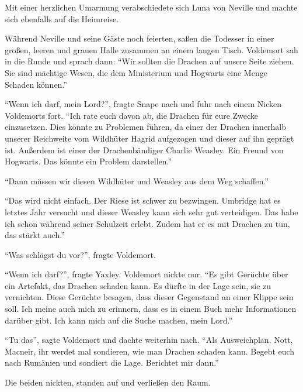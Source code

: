 Mit einer herzlichen Umarmung verabschiedete sich Luna von Neville und machte sich ebenfalls auf die Heimreise.

\trenn

Während Neville und seine Gäste noch feierten, saßen die Todesser in einer großen, leeren und grauen Halle zusammen an einem langen Tisch. Voldemort sah in die Runde und sprach dann: \enquote{Wir sollten die Drachen auf unsere Seite ziehen. Sie sind mächtige Wesen, die dem Ministerium und Hogwarts eine Menge Schaden können.}

\enquote{Wenn ich darf, mein Lord?}, fragte Snape nach und fuhr nach einem Nicken Voldemorts fort. \enquote{Ich rate euch davon ab, die Drachen für eure Zwecke einzusetzen. Dies könnte zu Problemen führen, da einer der Drachen innerhalb unserer Reichweite vom Wildhüter Hagrid aufgezogen und dieser auf ihn geprägt ist. Außerdem ist einer der Drachenbändiger Charlie Weasley. Ein Freund von Hogwarts. Das könnte ein Problem darstellen.}

\enquote{Dann müssen wir diesen Wildhüter und Weasley aus dem Weg schaffen.}

\enquote{Das wird nicht einfach. Der Riese ist schwer zu bezwingen. Umbridge hat es letztes Jahr versucht und dieser Weasley kann sich sehr gut verteidigen. Das habe ich schon während seiner Schulzeit erlebt. Zudem hat er es mit Drachen zu tun, das stärkt auch.}

\enquote{Was schlägst du vor?}, fragte Voldemort.

\enquote{Wenn ich darf?}, fragte Yaxley. Voldemort nickte nur. \enquote{Es gibt Gerüchte über ein Artefakt, das Drachen schaden kann. Es dürfte in der Lage sein, sie zu vernichten. Diese Gerüchte besagen, dass dieser Gegenstand an einer Klippe sein soll. Ich meine auch mich zu erinnern, dass es in einem Buch mehr Informationen darüber gibt. Ich kann mich auf die Suche machen, mein Lord.}

\enquote{Tu das}, sagte Voldemort und dachte weiterhin nach. \enquote{Als Ausweichplan. \gst Nott, Macneir, ihr werdet mal sondieren, wie man Drachen schaden kann. Begebt euch nach Rumänien und sondiert die Lage. Berichtet mir dann.}

Die beiden nickten, standen auf und verließen den Raum. 




